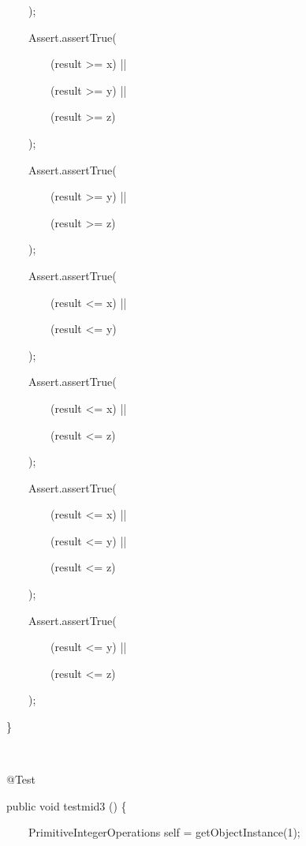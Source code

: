 \documentclass{article}
\newenvironment{tmindent}{\begin{tmparmod}{1.5em}{0pt}{0pt} }{\end{tmparmod}}
\newenvironment{tmparmod}[3]{\begin{list}{}{\setlength{\topsep}{0pt}\setlength{\leftmargin}{#1}\setlength{\rightmargin}{#2}\setlength{\parindent}{#3}\setlength{\listparindent}{\parindent}\setlength{\itemindent}{\parindent}\setlength{\parsep}{\parskip}} \item[]}{\end{list}}
\newenvironment{tmparsep}[1]{\begingroup\setlength{\parskip}{#1}}{\endgroup}
\begin{document}
\begin{example}
\begin{tmindent}
\begin{tmparsep}{0em}
      \ \ \ \ \ \ \ );
      
      \ \ \ \ \ \ \ Assert.assertTrue(
      
      \ \ \ \ \ \ \ \ \ \ \ (result >= x) ||
      
      \ \ \ \ \ \ \ \ \ \ \ (result >= y) ||
      
      \ \ \ \ \ \ \ \ \ \ \ (result >= z)
      
      \ \ \ \ \ \ \ );
      
      \ \ \ \ \ \ \ Assert.assertTrue(
      
      \ \ \ \ \ \ \ \ \ \ \ (result >= y) ||
      
      \ \ \ \ \ \ \ \ \ \ \ (result >= z)
      
      \ \ \ \ \ \ \ );
      
      \ \ \ \ \ \ \ Assert.assertTrue(
      
      \ \ \ \ \ \ \ \ \ \ \ (result <= x) ||
      
      \ \ \ \ \ \ \ \ \ \ \ (result <= y)
      
      \ \ \ \ \ \ \ );
      
      \ \ \ \ \ \ \ Assert.assertTrue(
      
      \ \ \ \ \ \ \ \ \ \ \ (result <= x) ||
      
      \ \ \ \ \ \ \ \ \ \ \ (result <= z)
      
      \ \ \ \ \ \ \ );
      
      \ \ \ \ \ \ \ Assert.assertTrue(
      
      \ \ \ \ \ \ \ \ \ \ \ (result <= x) ||
      
      \ \ \ \ \ \ \ \ \ \ \ (result <= y) ||
      
      \ \ \ \ \ \ \ \ \ \ \ (result <= z)
      
      \ \ \ \ \ \ \ );
      
      \ \ \ \ \ \ \ Assert.assertTrue(
      
      \ \ \ \ \ \ \ \ \ \ \ (result <= y) ||
      
      \ \ \ \ \ \ \ \ \ \ \ (result <= z)
      
      \ \ \ \ \ \ \ );
      
      \ \ \ \}
      
      \ \ \
      
      \ \ \ @Test
      
      \ \ \ public void testmid3 () \{
      
      \ \ \ \ \ \ \ PrimitiveIntegerOperations self = getObjectInstance(1);
      

\end{tmparsep}
\end{tmindent}
\end{example}
\end{document}
